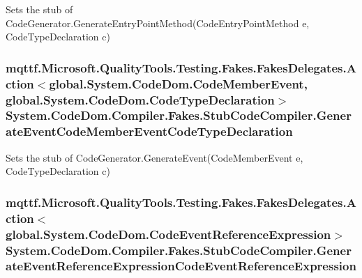 Sets the stub of Code\-Generator.\-Generate\-Entry\-Point\-Method(\-Code\-Entry\-Point\-Method e, Code\-Type\-Declaration c)

\hypertarget{class_system_1_1_code_dom_1_1_compiler_1_1_fakes_1_1_stub_code_compiler_aaa5ab548f2d33ef1b8829eaf4a48cb77}{
\subsubsection[{Generate\-Event\-Code\-Member\-Event\-Code\-Type\-Declaration}]{\setlength{\rightskip}{0pt plus 5cm}mqttf.\-Microsoft.\-Quality\-Tools.\-Testing.\-Fakes.\-Fakes\-Delegates.\-Action$<$global.\-System.\-Code\-Dom.\-Code\-Member\-Event, global.\-System.\-Code\-Dom.\-Code\-Type\-Declaration$>$ System.\-Code\-Dom.\-Compiler.\-Fakes.\-Stub\-Code\-Compiler.\-Generate\-Event\-Code\-Member\-Event\-Code\-Type\-Declaration}}\label{class_system_1_1_code_dom_1_1_compiler_1_1_fakes_1_1_stub_code_compiler_aaa5ab548f2d33ef1b8829eaf4a48cb77}


Sets the stub of Code\-Generator.\-Generate\-Event(\-Code\-Member\-Event e, Code\-Type\-Declaration c)

\hypertarget{class_system_1_1_code_dom_1_1_compiler_1_1_fakes_1_1_stub_code_compiler_abd623fdeca351a366ee60c3f49c52a49}{
\subsubsection[{Generate\-Event\-Reference\-Expression\-Code\-Event\-Reference\-Expression}]{\setlength{\rightskip}{0pt plus 5cm}mqttf.\-Microsoft.\-Quality\-Tools.\-Testing.\-Fakes.\-Fakes\-Delegates.\-Action$<$global.\-System.\-Code\-Dom.\-Code\-Event\-Reference\-Expression$>$ System.\-Code\-Dom.\-Compiler.\-Fakes.\-Stub\-Code\-Compiler.\-Generate\-Event\-Reference\-Expression\-Code\-Event\-Reference\-Expression}}\label{class_system_1_1_code_dom_1_1_compiler_1_1_fakes_1_1_stub_code_compiler_abd623fdeca351a366ee60c3f49c52a49}



